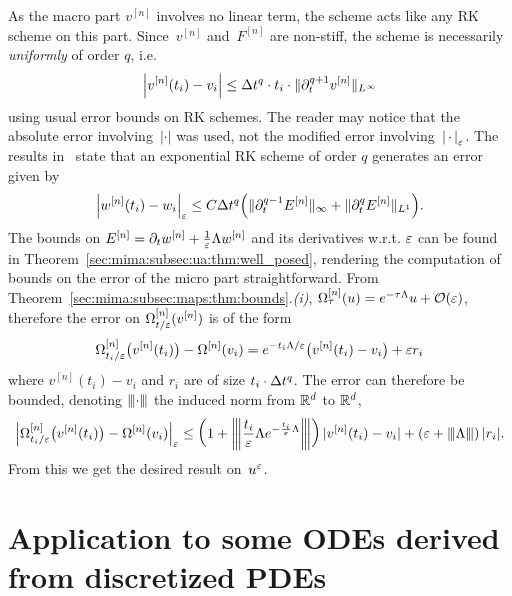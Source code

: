 As the macro part $v^{[n]}$ involves no linear term, the scheme acts like
any RK scheme on this part. Since~$v^{[n]}$ and~$F^{[n]}$ are non-stiff,
the scheme is necessarily \textit{uniformly} of order $q$, i.e. 
$$ 
\left| v^{[n]}(t_i) - v_i \right| 
\leq \Delta t^{q} \cdot t_i \cdot \| \partial_t^{q+1} v^{[n]} \|_{L^{\infty}} 
$$
using usual error bounds on RK schemes. The reader may notice that the
absolute error involving~$|\cdot|$ was used, not the modified error
involving~$\left\vert  \, \cdot \,  \right\vert _{\varepsilon}$. The results in~\cite{hochbruck.2004.exponential}
state that an exponential RK scheme of order $q$ generates an error given
by
\begin{equation} \label{mima_eq:err_on_w}
\left\vert  w^{[n]}(t_i) - w_i  \right\vert _{\varepsilon} \leq C \Delta t^{q} \Big( \| \partial_t^{q-1} E^{[n]} \|_{\infty} + \| \partial_t^{q} E^{[n]} \|_{L^1} \Big) . 
\end{equation}
The bounds on $E^{[n]} = \partial_t w^{[n]} + \frac{1}{\varepsilon} \Lambda w^{[n]}$
and its derivatives w.r.t. $\varepsilon$ can be found in
Theorem~\ref{sec:mima:subsec:ua:thm:well_posed}, rendering the computation
of bounds on the error of the micro part straightforward. 
%
From Theorem~\ref{sec:mima:subsec:maps:thm:bounds}.\textit{(i)},
$\Omega^{[n]}_{\tau}(u) = e^{-\tau \Lambda} u + \mathcal{O}(\varepsilon)$, therefore
the error on $\Omega^{[n]}_{t/\varepsilon}(v^{[n]})$ is of the form 
$$ 
\Omega^{[n]}_{t_i/\varepsilon} \big( v^{[n]}(t_i) \big) - \Omega^{[n]}(v_i) 
= e^{-t_i \Lambda/\varepsilon} \big(v^{[n]}(t_i) - v_i \big) + \varepsilon r_i
$$
where $v^{[n]}(t_i) - v_i$ and $r_i$ are of size $t_i \cdot \Delta t^q$. 
%
The error can therefore be bounded, denoting ${\left\vert\kern-0.25ex\left\vert\kern-0.25ex\left\vert \cdot \right\vert\kern-0.25ex\right\vert\kern-0.25ex\right\vert}$ the induced
norm from $\mathbb{R}^d$ to $\mathbb{R}^d$,  
$$
\left\vert  \Omega^{[n]}_{t_i/\varepsilon} \big( v^{[n]}(t_i) \big) - \Omega^{[n]}(v_i)  \right\vert _{\varepsilon}
\leq \left( 1 + {\left\vert\kern-0.25ex\left\vert\kern-0.25ex\left\vert  \frac{t_i}{\varepsilon}\Lambda e^{-\frac{t_i}{\varepsilon} \Lambda }  \right\vert\kern-0.25ex\right\vert\kern-0.25ex\right\vert} \right) | v^{[n]}(t_i) - v_i | + \left( \varepsilon + {\left\vert\kern-0.25ex\left\vert\kern-0.25ex\left\vert \Lambda \right\vert\kern-0.25ex\right\vert\kern-0.25ex\right\vert} \right) | r_i | .
$$
From this we get the desired result on~$u^{\varepsilon}$. 
\vspace*{-6pt}
\begin{flushright}
\qedsymbol
\end{flushright}









\section{Application to some ODEs derived from discretized PDEs}
\label{sec:pde}


